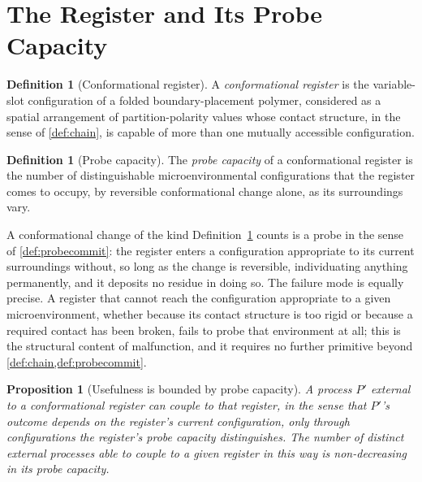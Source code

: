 \documentclass[11pt,twocolumn,a4paper]{article}
\theoremstyle{plain}
\newtheorem{proposition}[theorem]{Proposition}
\theoremstyle{definition}
\newtheorem{definition}[theorem]{Definition}
\theoremstyle{remark}
\begin{document}
\section{The Register and Its Probe Capacity}
\label{sec:register}

\begin{definition}[Conformational register]
\label{def:register}
A \emph{conformational register} is the variable-slot configuration of a
folded boundary-placement polymer, considered as a spatial arrangement of
partition-polarity values whose contact structure, in the sense of
\cref{def:chain}, is capable of more than one mutually accessible
configuration.
\end{definition}

\begin{definition}[Probe capacity]
\label{def:probecapacity}
The \emph{probe capacity} of a conformational register is the number of
distinguishable microenvironmental configurations that the register comes
to occupy, by reversible conformational change alone, as its surroundings
vary.
\end{definition}

A conformational change of the kind Definition~\ref{def:probecapacity}
counts is a probe in the sense of \cref{def:probecommit}: the register
enters a configuration appropriate to its current surroundings without,
so long as the change is reversible, individuating anything permanently,
and it deposits no residue in doing so. The failure mode is equally
precise. A register that cannot reach the configuration appropriate to a
given microenvironment, whether because its contact structure is too
rigid or because a required contact has been broken, fails to probe that
environment at all; this is the structural content of malfunction, and it
requires no further primitive beyond \cref{def:chain,def:probecommit}.

\begin{proposition}[Usefulness is bounded by probe capacity]
\label{prop:usefulness}
A process $P'$ external to a conformational register can couple to that
register, in the sense that $P'$'s outcome depends on the register's
current configuration, only through configurations the register's probe
capacity distinguishes. The number of distinct external processes able to
couple to a given register in this way is non-decreasing in its probe
capacity.
\end{proposition}
\end{document}
